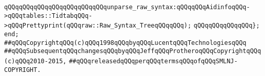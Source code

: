 \verb|qQQqqQQqqQQqqQQqqQQqqQQqqQQqunparse_raw_syntax:qQQqqQQqAidinfoqQQq->qQQqtables::TidtabqQQq->qQQqPrettyprint(qQQqraw::Raw_Syntax_TreeqQQqqQQq);|\newline
\newline
\verb|qQQqqQQqqQQqqQQq};|\newline
\verb|end;|\newline
\newline
\newline
\verb|##qQQqCopyrightqQQq(c)qQQq1998qQQqbyqQQqLucentqQQqTechnologiesqQQq|\newline
\verb|##qQQqSubsequentqQQqchangesqQQqbyqQQqJeffqQQqProtheroqQQqCopyrightqQQq(c)qQQq2010-2015,|\newline
\verb|##qQQqreleasedqQQqperqQQqtermsqQQqofqQQqSMLNJ-COPYRIGHT.|\newline


